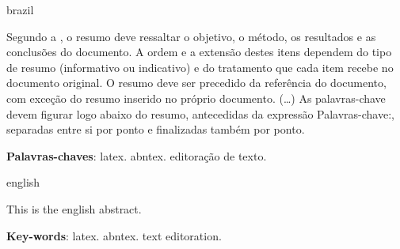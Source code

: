 
%
\begin{otherlanguage*}{brazil}
\begin{resumo}

    Segundo a , o resumo deve ressaltar o
    objetivo, o método, os resultados e as conclusões do documento. A ordem e a extensão
    destes itens dependem do tipo de resumo (informativo ou indicativo) e do
    tratamento que cada item recebe no documento original. O resumo deve ser
    precedido da referência do documento, com exceção do resumo inserido no
    próprio documento. (\ldots) As palavras-chave devem figurar logo abaixo do
    resumo, antecedidas da expressão Palavras-chave:, separadas entre si por
    ponto e finalizadas também por ponto.

\vspace{\onelineskip}
\noindent \textbf{Palavras-chaves}: latex. abntex. editoração de texto.

\end{resumo}
\end{otherlanguage*}


\begin{otherlanguage*}{english}
\begin{resumo}[Abstract]

    This is the english abstract.

    \vspace{\onelineskip}
    \noindent\textbf{Key-words}: latex. abntex. text editoration.

\end{resumo}
\end{otherlanguage*}


%
%
%
%
%
%


